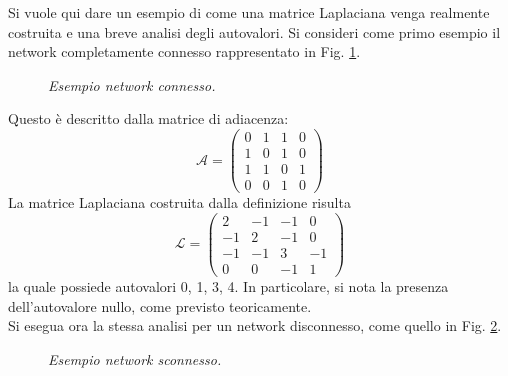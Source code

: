 Si vuole qui dare un esempio di come una matrice Laplaciana venga realmente costruita e una breve analisi degli autovalori.
Si consideri come primo esempio il network completamente connesso rappresentato in Fig. \ref{fig:network_connesso}.
\begin{figure}[H]
    \centering
    \caption[Grafo di un network connesso]{\emph{Esempio network connesso.}}
    \label{fig:network_connesso}
\end{figure}
Questo \`e descritto dalla matrice di adiacenza:
\begin{equation}
    \mathcal{A}=\left(
    \begin{matrix}
        0 & 1 & 1 & 0\\
        1 & 0 & 1 & 0\\
        1 & 1 & 0 & 1\\
        0 & 0 & 1 & 0
    \end{matrix}\right)
\end{equation}
La matrice Laplaciana costruita dalla definizione risulta
\begin{equation}
    \mathcal{L}=\left(
    \begin{matrix}
        2 & -1 & -1 & 0\\
        -1 & 2 & -1 & 0\\
        -1 & -1 & 3 & -1\\
        0 & 0 & -1 & 1
    \end{matrix}\right)
\end{equation}
la quale possiede autovalori 0, 1, 3, 4.
In particolare, si nota la presenza dell'autovalore nullo, come previsto teoricamente.\\
Si esegua ora la stessa analisi per un network disconnesso, come quello in Fig. \ref{fig:network_sconnesso}.
\begin{figure}[H]
    \centering
    \caption[Grafo di un network sconnesso]{\emph{Esempio network sconnesso.}}
    \label{fig:network_sconnesso}
\end{figure}
